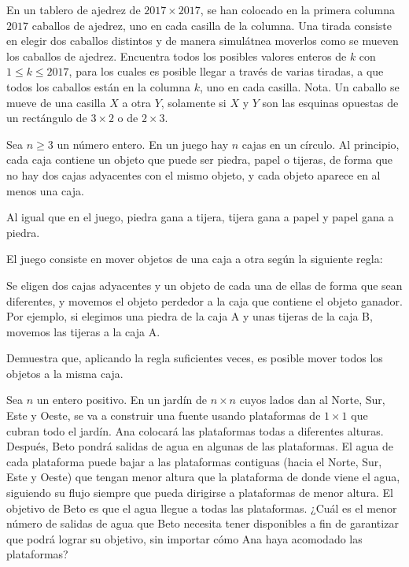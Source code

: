 \documentclass[11pt]{scrartcl}
\begin{document}
\begin{problem} [2017/1]
    
    En un tablero de ajedrez de $2017 \times 2017$, se han colocado en la primera columna $2017$
caballos de ajedrez, uno en cada casilla de la columna. Una tirada consiste en elegir dos
caballos distintos y de manera simulátnea moverlos como se mueven los caballos de ajedrez.
Encuentra todos los posibles valores enteros de $k$ con $1 \leq k \leq 2017$, para los cuales es
posible llegar a través de varias tiradas, a que todos los caballos están en la columna $k$, uno
en cada casilla.
Nota. Un caballo se mueve de una casilla $X$ a otra $Y$, solamente si $X$ y $Y$ son las esquinas
opuestas de un rectángulo de $3 \times 2$ o de $2 \times 3$.
\end{problem}
\begin{problem}
    [2020/4] 
    Sea $n\ge 3$ un número entero. En un juego hay $n$ cajas en un círculo. Al principio, cada caja contiene un objeto que puede ser piedra, papel o tijeras, de forma que no hay dos cajas adyacentes con el mismo objeto, y cada objeto aparece en al menos una caja. 

Al igual que en el juego, piedra gana a tijera, tijera gana a papel y papel gana a piedra.   

El juego consiste en mover objetos de una caja a otra según la siguiente regla:  

Se eligen dos cajas adyacentes y un objeto de cada una de ellas de forma que sean diferentes, y movemos el objeto perdedor a la caja que contiene el objeto ganador. Por ejemplo, si elegimos una piedra de la caja A y unas tijeras de la caja B, movemos las tijeras a la caja A. 

Demuestra que, aplicando la regla suficientes veces, es posible mover todos los objetos a la misma caja.
\end{problem}
\begin{problem}
    [2022/4] 
    Sea $n$ un entero positivo. En un jardín de $n\times n$ cuyos lados dan al Norte, Sur, Este y Oeste, se va a construir una fuente usando plataformas de $1\times 1$ que cubran todo el jardín. Ana colocará las plataformas todas a diferentes alturas. Después, Beto pondrá salidas de agua en algunas de las plataformas. El agua de cada plataforma puede bajar a las plataformas contiguas (hacia el Norte, Sur, Este y Oeste) que tengan menor altura que la plataforma de donde viene el agua, siguiendo su flujo siempre que pueda dirigirse a plataformas de menor altura. El objetivo de Beto es que el agua llegue a todas las plataformas. ¿Cuál es el menor número de salidas de agua que Beto necesita tener disponibles a fin de garantizar que podrá lograr su objetivo, sin importar cómo Ana haya acomodado las plataformas?
\end{problem}
\end{document}
